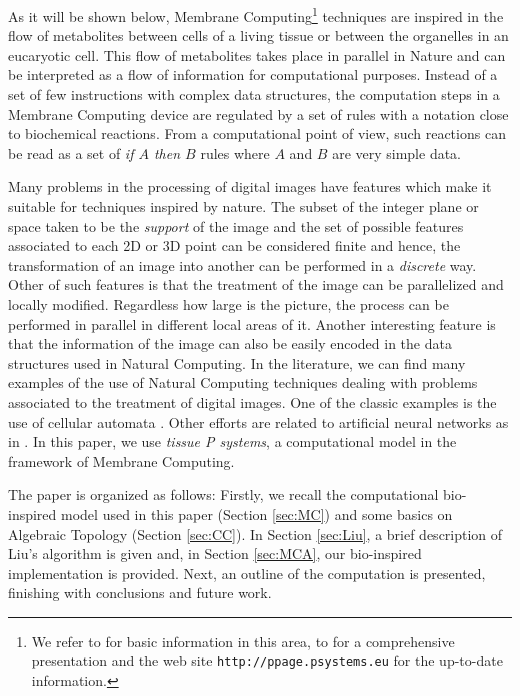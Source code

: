 \documentclass[journal]{IEEEtran}
\begin{document}
As it will be shown below, Membrane Computing\footnote{We refer to
\cite{paunbook} for basic information in this area, to
\cite{HandbookMC10} for a comprehensive presentation and the web
site {\tt http://ppage.psystems.eu} for the up-to-date information.}
techniques are inspired in the flow of metabolites between cells of
a living tissue or between the organelles in an eucaryotic cell.
This flow of metabolites takes place in parallel in Nature and can
be interpreted as a flow of information for computational purposes.
Instead of a set of few instructions with complex data structures,
the computation steps in a Membrane Computing device are regulated
by a set of rules with a notation close to biochemical reactions.
From a computational point of view, such reactions can be read as a
set of {\it if $A$ then $B$} rules where $A$ and $B$ are very simple
data.

Many problems in the processing of digital images have features
which make it suitable for techniques inspired by nature. The subset
of the integer plane or space taken to be the {\it support} of the
image and the set of possible features associated to each 2D or 3D
point can be considered finite and hence, the transformation of an
image into another can be performed in a \emph{discrete} way. Other
of such features is that the treatment of the image can be
parallelized and locally modified. Regardless how large is the
picture, the process can be performed in parallel in different local
areas of it. Another interesting feature is that the information of
the image can also be easily encoded in the data structures used in
Natural Computing. In the literature, we can find many examples of
the use of Natural Computing techniques dealing with problems
associated to the treatment of digital images. One of the classic
examples is the use of cellular automata
\cite{DBLP:journals/tip/Rosin06}. Other efforts are related to
artificial neural networks as in
\cite{DBLP:journals/pr/Egmont-PetersenRH02}. In this paper, we use
{\it tissue P systems}, a computational model in the framework of
Membrane Computing.

The paper is organized as follows: Firstly, we recall the
computational bio-inspired model used in this paper (Section
\ref{sec:MC}) and some basics on Algebraic Topology (Section
\ref{sec:CC}). In Section \ref{sec:Liu}, a brief description of
Liu's algorithm is given and, in Section \ref{sec:MCA}, our
bio-inspired implementation is provided. Next, an outline of the
computation is presented, finishing with conclusions and future
work.
\end{document}
